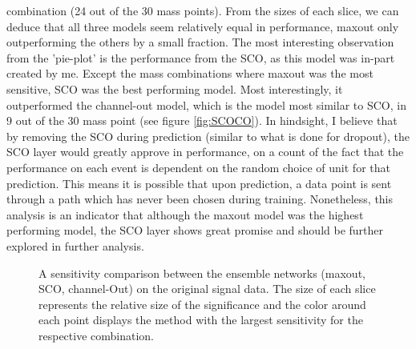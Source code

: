 combination (24 out of the 30 mass points). From the sizes of each slice, we can deduce that all three models seem relatively equal in performance, maxout only 
outperforming the others by a small fraction. The most interesting observation from the 'pie-plot' is the performance from the \ac{SCO}, as 
this model was in-part created by me. Except the mass combinations where maxout was the most sensitive, \ac{SCO} was the best performing model. 
Most interestingly, it outperformed the channel-out model, which is the model most similar to \ac{SCO}, in 9 out of the 30 mass point (see figure \ref{fig:SCOCO}). 
In hindsight, I believe that by removing the \ac{SCO} during prediction (similar to what is done for dropout), the \ac{SCO} layer would greatly 
approve in performance, on a count of the fact that the performance on each event is dependent on the random choice of unit for that prediction.
This means it is possible that upon prediction, a data point is sent through a path which has never been chosen during training. 
Nonetheless, this analysis is an indicator that although the maxout model was the highest performing model, the \ac{SCO} layer shows 
great promise and should be further explored in further analysis. 
\begin{figure}
    \caption[A sensitivity comparison between the ensemble networks (maxout, \acs{SCO}, channel-Out) on the original 
    signal data.]{A sensitivity comparison between the ensemble networks (maxout, \acs{SCO}, channel-Out) on the original 
    signal data. The size of each slice represents the relative size of the significance and the color around each 
    point displays the method with the largest sensitivity for the respective combination.}
    \label{fig:EnsembleComp}
\end{figure}

